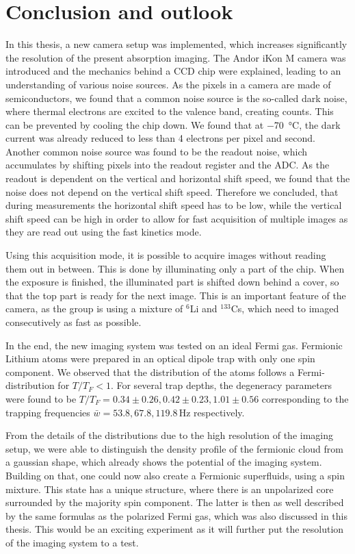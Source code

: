 \chapter{Conclusion and outlook}

In this thesis, a new camera setup was implemented, which increases significantly the resolution of the present absorption imaging. The Andor iKon M camera was introduced and the mechanics behind a CCD chip were explained, leading to an understanding of various noise sources. As the pixels in a camera are made of semiconductors, we found that a common noise source is the so-called dark noise, where thermal electrons are excited to the valence band, creating counts. This can be prevented by cooling the chip down. We found that at \SI{-70}{\degreeCelsius}, the dark current was already reduced to less than 4 electrons per pixel and second. Another common noise source was found to be the readout noise, which accumulates by shifting pixels into the readout register and the ADC.
As the readout is dependent on the vertical and horizontal shift speed, we found that the noise does not depend on the vertical shift speed. Therefore we concluded, that during measurements the horizontal shift speed has to be low, while the vertical shift speed can be high in order to allow for fast acquisition of multiple images as they are read out using the fast kinetics mode.

Using this acquisition mode, it is possible to acquire images without reading them out in between. This is done by illuminating only a part of the chip. When the exposure is finished, the illuminated part is shifted down behind a cover, so that the top part is ready for the next image. This is an important feature of the camera, as the group is using a mixture of $^6$Li and $^{133}$Cs, which need to imaged consecutively as fast as possible.

In the end, the new imaging system was tested on an ideal Fermi gas. Fermionic Lithium atoms were prepared in an optical dipole trap with only one spin component. We observed that the distribution of the atoms follows a Fermi-distribution for $T/T_F < 1$. For several trap depths, the degeneracy parameters were found to be $T/T_F= 0.34\pm0.26, 0.42\pm0.23, 1.01\pm0.56$ corresponding to the trapping frequencies $\bar{w}=53.8, 67.8, 119.8 \,\mathrm{Hz}$ respectively.

From the details of the distributions due to the high resolution of the imaging setup, we were able to distinguish the density profile of the fermionic cloud from a gaussian shape, which already shows the potential of the imaging system. Building on that, one could now also create a Fermionic superfluids, using a spin mixture. This state has a unique structure, where there is an unpolarized core surrounded by the majority spin component\cite{Shin2006,Zwierlein2006b}. The latter is then as well described by the same formulas as the polarized Fermi gas, which was also discussed in this thesis. This would be an exciting experiment as it will further put the resolution of the imaging system to a test.
